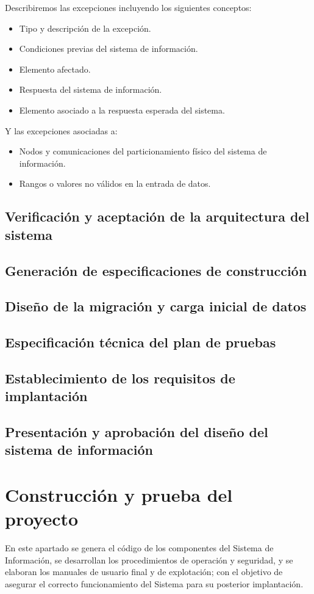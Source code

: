 \documentclass[11pt,a4paper,spanish,twoside]{report}
\begin{document}
\begin{itemize}
Describiremos las excepciones incluyendo los siguientes conceptos:
\begin{itemize}
\item Tipo y descripción de la excepción.
\item Condiciones previas del sistema de información.
\item Elemento afectado.
\item Respuesta del sistema de información.
\item Elemento asociado a la respuesta esperada del sistema.
\end{itemize}

Y las excepciones asociadas a:
\begin{itemize}
\item Nodos y comunicaciones del particionamiento físico del sistema de
  información. 
\item Rangos o valores no válidos en la entrada de datos.
\end{itemize}

\subsection{Verificación y aceptación de la arquitectura del sistema}
\subsection{Generación de especificaciones de construcción}
\subsection{Diseño de la migración y carga inicial de datos}
\subsection{Especificación técnica del plan de pruebas}
\subsection{Establecimiento de los requisitos de implantación}
\subsection{Presentación y aprobación del diseño del sistema de información}
\section{Construcción y prueba del proyecto}
En este apartado se genera el código de los componentes del Sistema de 
Información, se desarrollan los procedimientos de operación y seguridad, y se 
elaboran los manuales de usuario final y de explotación; con el objetivo de 
asegurar el correcto funcionamiento del Sistema para su posterior implantación.


\end{itemize}
\end{document}
